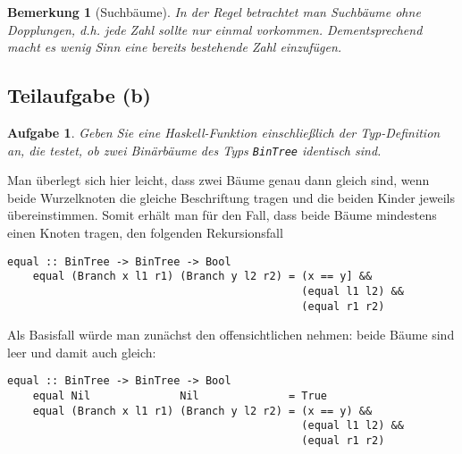\documentclass[ngerman, a4paper, 11pt]{article}
\newcounter{themcount}
\theoremstyle{nonumberplain}
\newtheorem{aufgabe}{Aufgabe}
\newtheorem{bemerkung}[themcount]{Bemerkung}
\begin{document}
\begin{bemerkung}[Suchbäume]
	In der Regel betrachtet man Suchbäume ohne Dopplungen, d.h. jede Zahl sollte nur einmal vorkommen. Dementsprechend macht es wenig Sinn eine bereits bestehende Zahl einzufügen. 
\end{bemerkung}

\subsection*{Teilaufgabe (b)}

\begin{aufgabe}
	Geben Sie eine Haskell-Funktion einschließlich der Typ-Definition an, die testet, ob zwei Binärbäume des Typs \texttt{BinTree} identisch sind.
\end{aufgabe}
Man überlegt sich hier leicht, dass zwei Bäume genau dann gleich sind, wenn beide Wurzelknoten die gleiche Beschriftung tragen und die beiden Kinder jeweils übereinstimmen. Somit erhält man für den Fall, dass beide Bäume mindestens einen Knoten tragen, den folgenden Rekursionsfall
\begin{lstlisting}[style=noframe]
	equal :: BinTree -> BinTree -> Bool
	equal (Branch x l1 r1) (Branch y l2 r2) = (x == y] && 
	                                          (equal l1 l2) && 
	                                          (equal r1 r2)
\end{lstlisting}
Als Basisfall würde man zunächst den offensichtlichen nehmen: beide Bäume sind leer und damit auch gleich:
\begin{lstlisting}[style=noframe]
	equal :: BinTree -> BinTree -> Bool
	equal Nil              Nil              = True
	equal (Branch x l1 r1) (Branch y l2 r2) = (x == y) && 
	                                          (equal l1 l2) && 
	                                          (equal r1 r2)
\end{lstlisting}
\end{document}
